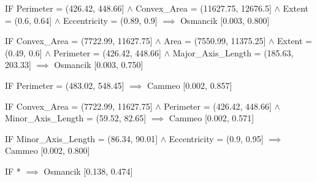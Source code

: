 IF Perimeter = (426.42, 448.66] $\land$ Convex_Area = (11627.75, 12676.5] $\land$ Extent = (0.6, 0.64] $\land$ Eccentricity = (0.89, 0.9] $\implies$ Osmancik [0.003, 0.800]

IF Convex_Area = (7722.99, 11627.75] $\land$ Area = (7550.99, 11375.25] $\land$ Extent = (0.49, 0.6] $\land$ Perimeter = (426.42, 448.66] $\land$ Major_Axis_Length = (185.63, 203.33] $\implies$ Osmancik [0.003, 0.750]

IF Perimeter = (483.02, 548.45] $\implies$ Cammeo [0.002, 0.857]

IF Convex_Area = (7722.99, 11627.75] $\land$ Perimeter = (426.42, 448.66] $\land$ Minor_Axis_Length = (59.52, 82.65] $\implies$ Cammeo [0.002, 0.571]

IF Minor_Axis_Length = (86.34, 90.01] $\land$ Eccentricity = (0.9, 0.95] $\implies$ Cammeo [0.002, 0.800]

IF * $\implies$ Osmancik [0.138, 0.474]
